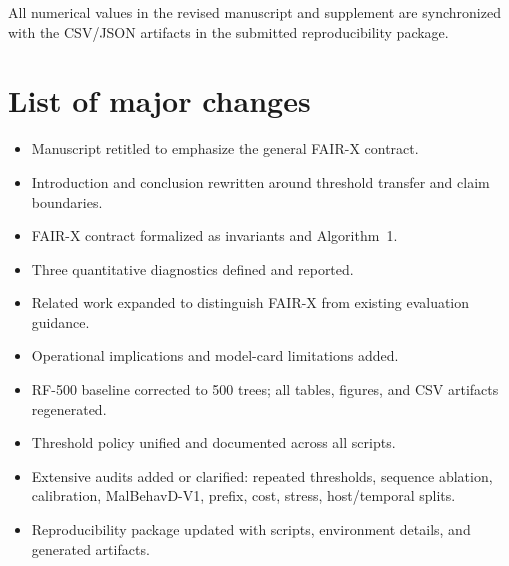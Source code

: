 \documentclass[11pt]{article}
\begin{document}
All numerical values in the revised manuscript and supplement are synchronized with the CSV/JSON artifacts in the submitted reproducibility package.

\section*{List of major changes}

\begin{itemize}[nosep]
    \item Manuscript retitled to emphasize the general FAIR-X contract.
    \item Introduction and conclusion rewritten around threshold transfer and claim boundaries.
    \item FAIR-X contract formalized as invariants and Algorithm~1.
    \item Three quantitative diagnostics defined and reported.
    \item Related work expanded to distinguish FAIR-X from existing evaluation guidance.
    \item Operational implications and model-card limitations added.
    \item RF-500 baseline corrected to 500 trees; all tables, figures, and CSV artifacts regenerated.
    \item Threshold policy unified and documented across all scripts.
    \item Extensive audits added or clarified: repeated thresholds, sequence ablation, calibration, MalBehavD-V1, prefix, cost, stress, host/temporal splits.
    \item Reproducibility package updated with scripts, environment details, and generated artifacts.
\end{itemize}
\end{document}
